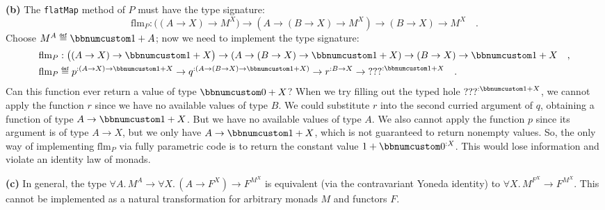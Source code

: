 \textbf{(b)} The \lstinline!flatMap! method of $P$ must have the
type signature:
\[
\text{flm}_{P}:\big((A\rightarrow X)\rightarrow M^{X}\big)\rightarrow(A\rightarrow(B\rightarrow X)\rightarrow M^{X})\rightarrow(B\rightarrow X)\rightarrow M^{X}\quad.
\]
Choose $M^{A}\triangleq\bbnum 1+A$; now we need to implement the
type signature:
\begin{align*}
 & \text{flm}_{P}:\big((A\rightarrow X)\rightarrow\bbnum 1+X\big)\rightarrow\left(A\rightarrow(B\rightarrow X)\rightarrow\bbnum 1+X\right)\rightarrow(B\rightarrow X)\rightarrow\bbnum 1+X\quad,\\
 & \text{flm}_{P}\triangleq p^{:(A\rightarrow X)\rightarrow\bbnum 1+X}\rightarrow q^{:\left(A\rightarrow(B\rightarrow X)\rightarrow\bbnum 1+X\right)}\rightarrow r^{:B\rightarrow X}\rightarrow\text{???}^{:\bbnum 1+X}\quad.
\end{align*}
Can this function ever return a value of type $\bbnum 0+X$? When
we try filling out the typed hole $\text{???}^{:\bbnum 1+X}$, we
cannot apply the function $r$ since we have no available values of
type $B$. We could substitute $r$ into the second curried argument
of $q$, obtaining a function of type $A\rightarrow\bbnum 1+X$. But
we have no available values of type $A$. We also cannot apply the
function $p$ since its argument is of type $A\rightarrow X$, but
we only have $A\rightarrow\bbnum 1+X$, which is not guaranteed to
return nonempty values. So, the only way of implementing $\text{flm}_{P}$
via fully parametric code is to return the constant value $1+\bbnum 0^{:X}$.
This would lose information and violate an identity law of monads.

\textbf{(c)} In general, the type $\forall A.\,M^{A}\rightarrow\forall X.\,(A\rightarrow F^{X})\rightarrow F^{M^{X}}$
is equivalent (via the contravariant Yoneda identity) to $\forall X.\,M^{F^{X}}\rightarrow F^{M^{X}}$.
This cannot be implemented as a natural transformation for arbitrary
monads $M$ and functors $F$.


